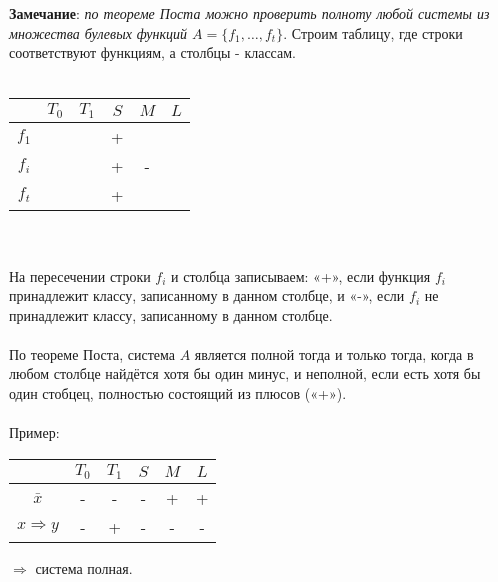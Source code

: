\documentclass[a4paper, 12pt]{report}
\begin{document}
\textbf{Замечание}: \textit{по теореме Поста можно проверить полноту любой системы из множества булевых функций $A = \{f_1,\dotso, f_t\}$}. Строим таблицу, где строки соответствуют функциям, а столбцы - классам.\\\\
\begin{tabular}{|c|c|c|c|c|c|}
\hline
  & $T_0$ & $T_1$ & $S$ & $M$ & $L$\\
\hline
   $f_1$  &  &  & + &  &  \\
   $f_i$  &  &  & + & - &  \\
   $f_t$  &  &  & + &  &   \\
\hline
\end{tabular}\\\\			
На пересечении строки $f_i$ и столбца записываем: «+», если функция $f_i$ принадлежит классу, записанному в данном столбце, и «-»,  если $f_i$ не принадлежит классу, записанному в данном столбце.\\\\
По теореме Поста, система $A$ является полной тогда и только тогда, когда в любом столбце найдётся хотя бы один минус, и неполной, если есть хотя бы один стобцец, полностью состоящий из плюсов («+»).\\\\
Пример:\\
\begin{tabular}{|c|c|c|c|c|c|}
\hline
  & $T_0$ & $T_1$ & $S$ & $M$ & $L$\\
\hline
   $\bar x$ & - & - & - & + & + \\
   $x \Rightarrow y$ & - & + & - & - & - \\
\hline
\end{tabular} $\Rightarrow$ система полная.
    
\end{document}

